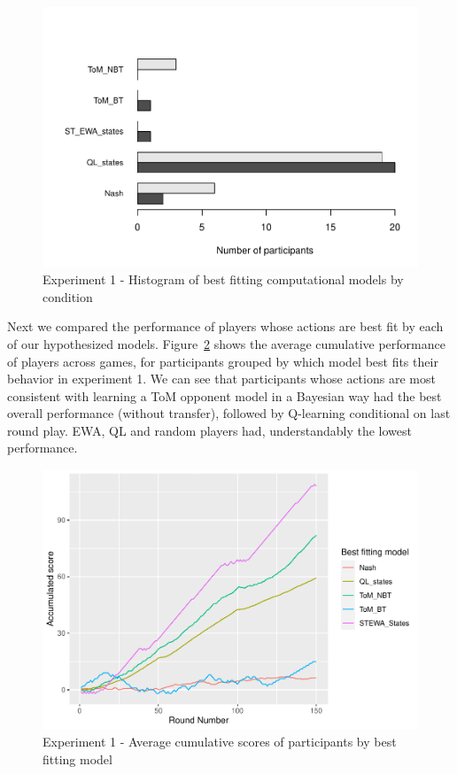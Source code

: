 \documentclass[man,floatsintext]{apa6}
\begin{document}
\begin{figure}

{\centering \includegraphics{draft_upgrade_v1_files/figure-latex/exp1-comp-models-1} 

}

\caption{Experiment 1 - Histogram of best fitting computational models by condition}\label{fig:exp1-comp-models}
\end{figure}

Next we compared the performance of players whose actions are best fit by each of our hypothesized models. Figure~\ref{fig:exp1-cumScores} shows the average cumulative performance of players across games, for participants grouped by which model best fits their behavior in experiment 1. We can see that participants whose actions are most consistent with learning a ToM opponent model in a Bayesian way had the best overall performance (without transfer), followed by Q-learning conditional on last round play. EWA, QL and random players had, understandably the lowest performance.

\begin{figure}

{\centering \includegraphics{draft_upgrade_v1_files/figure-latex/exp1-cumScores-1} 

}

\caption{Experiment 1 - Average cumulative scores of participants by best fitting model}\label{fig:exp1-cumScores}
\end{figure}
\end{document}
